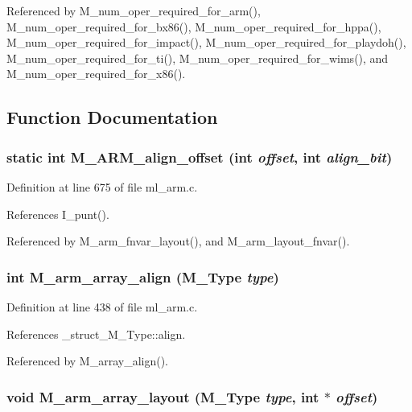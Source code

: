 Referenced by M\_\-num\_\-oper\_\-required\_\-for\_\-arm(), M\_\-num\_\-oper\_\-required\_\-for\_\-bx86(), M\_\-num\_\-oper\_\-required\_\-for\_\-hppa(), M\_\-num\_\-oper\_\-required\_\-for\_\-impact(), M\_\-num\_\-oper\_\-required\_\-for\_\-playdoh(), M\_\-num\_\-oper\_\-required\_\-for\_\-ti(), M\_\-num\_\-oper\_\-required\_\-for\_\-wims(), and M\_\-num\_\-oper\_\-required\_\-for\_\-x86().

\subsection{Function Documentation}
\subsubsection{\setlength{\rightskip}{0pt plus 5cm}static int M\_\-ARM\_\-align\_\-offset (int {\em offset}, int {\em align\_\-bit})\hspace{0.3cm}{\tt  [static]}}\label{ml__arm_8c_7552ce5f16999937ba9924b41b8b8be9}




Definition at line 675 of file ml\_\-arm.c.

References I\_\-punt().

Referenced by M\_\-arm\_\-fnvar\_\-layout(), and M\_\-arm\_\-layout\_\-fnvar().
\subsubsection{\setlength{\rightskip}{0pt plus 5cm}int M\_\-arm\_\-array\_\-align (\bf{M\_\-Type} {\em type})}\label{ml__arm_8c_4e8f6b62ddef8e5d52ef23d7e70c649a}




Definition at line 438 of file ml\_\-arm.c.

References \_\-struct\_\-M\_\-Type::align.

Referenced by M\_\-array\_\-align().
\subsubsection{\setlength{\rightskip}{0pt plus 5cm}void M\_\-arm\_\-array\_\-layout (\bf{M\_\-Type} {\em type}, int $\ast$ {\em offset})}\label{ml__arm_8c_af6e70a2ab899b8b7ee98e42197f6930}




